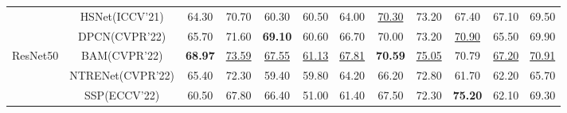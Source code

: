 \documentclass[10pt,twocolumn,letterpaper]{article}
\begin{document}
\begin{table*}[htbp]
\begin{tabular}{c|ccccccccccc}
		& \multicolumn{1}{c|}{HSNet(ICCV'21)\cite{hsnet}}                         & 64.30                                  & 70.70                                  & 60.30                         & 60.50                                  & \multicolumn{1}{c|}{64.00}                                  & \underline{70.30}                         & 73.20                                  & 67.40              & 67.10                                  & 69.50                         \\
		& \multicolumn{1}{c|}{DPCN(CVPR'22)\cite{dpcn}}                         & 65.70                                  & 71.60                                  & \textbf{69.10}                         & 60.60                                  & \multicolumn{1}{c|}{66.70}                                  & 70.00                         & 73.20                                  & \underline{70.90}                & 65.50                                  & 69.90                         \\
		ResNet50                   & \multicolumn{1}{c|}{BAM(CVPR'22)\cite{bam}}                          & \textbf{68.97}                         & \underline{73.59}                                  & \underline{67.55}                                  & \underline{61.13}                                  & \multicolumn{1}{c|}{\underline{67.81}}                                  & \textbf{70.59}                & \underline{75.05}                                  & 70.79                         & \underline{67.20}                        & \underline{70.91}                \\
		& \multicolumn{1}{c|}{NTRENet(CVPR'22)\cite{ntre}}                         & 65.40                                  & 72.30                                  & 59.40                                  & 59.80                                  & \multicolumn{1}{c|}{64.20}                                  & 66.20                         & 72.80                                  & 61.70                         & 62.20                                  & 65.70              \\           
		& \multicolumn{1}{c|}{SSP(ECCV'22)\cite{ssp}}                         & 60.50                                  & 67.80                                  & 66.40                         & 51.00                                  & \multicolumn{1}{c|}{61.40}                                  & 67.50                         & 72.30                                  & \textbf{75.20}              & 62.10                                  & 69.30                         \\  

\end{tabular}
\end{table*}
\end{document}
